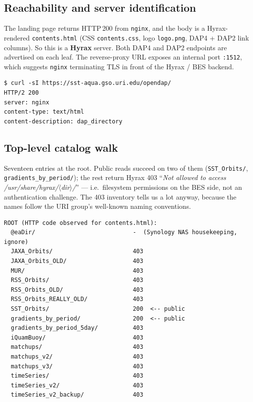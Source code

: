 \documentclass[11pt]{article}
\begin{document}
\subsection{Reachability and server identification}

The landing page returns HTTP\,200 from \texttt{nginx}, and the body is
a Hyrax-rendered \texttt{contents.html} (CSS \texttt{contents.css},
logo \texttt{logo.png}, DAP4 + DAP2 link columns). So this is a
\textbf{Hyrax} server. Both DAP4 and DAP2 endpoints are advertised on
each leaf. The reverse-proxy URL exposes an internal port
\texttt{:1512}, which suggests \texttt{nginx} terminating TLS in front
of the Hyrax / BES backend.

\begin{lstlisting}
$ curl -sI https://sst-aqua.gso.uri.edu/opendap/
HTTP/2 200
server: nginx
content-type: text/html
content-description: dap_directory
\end{lstlisting}

\subsection{Top-level catalog walk}

Seventeen entries at the root. Public reads succeed on two of them
(\texttt{SST\_Orbits/}, \texttt{gradients\_by\_period/}); the rest
return Hyrax 403 ``\emph{Not allowed to access
/usr/share/hyrax/$\langle$dir$\rangle$/}'' --- i.e.\ filesystem
permissions on the BES side, not an authentication challenge. The 403
inventory tells us a lot anyway, because the names follow the URI
group's well-known naming conventions.

\begin{lstlisting}
ROOT (HTTP code observed for contents.html):
  @eaDir/                            -  (Synology NAS housekeeping, ignore)
  JAXA_Orbits/                       403
  JAXA_Orbits_OLD/                   403
  MUR/                               403
  RSS_Orbits/                        403
  RSS_Orbits_OLD/                    403
  RSS_Orbits_REALLY_OLD/             403
  SST_Orbits/                        200  <-- public
  gradients_by_period/               200  <-- public
  gradients_by_period_5day/          403
  iQuamBuoy/                         403
  matchups/                          403
  matchups_v2/                       403
  matchups_v3/                       403
  timeSeries/                        403
  timeSeries_v2/                     403
  timeSeries_v2_backup/              403
\end{lstlisting}
\end{document}
